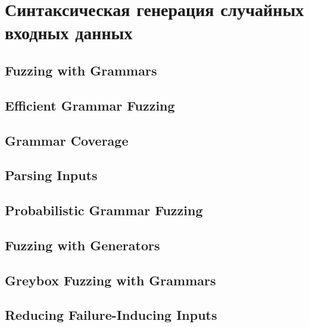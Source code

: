 \section{Синтаксическая генерация случайных входных данных} \label{section_3}

\subsection{Fuzzing with Grammars}


\subsection{Efficient Grammar Fuzzing}


\subsection{Grammar Coverage}


\subsection{Parsing Inputs}


\subsection{Probabilistic Grammar Fuzzing}


\subsection{Fuzzing with Generators}

\subsection{Greybox Fuzzing with Grammars}

\subsection{Reducing Failure-Inducing Inputs}
